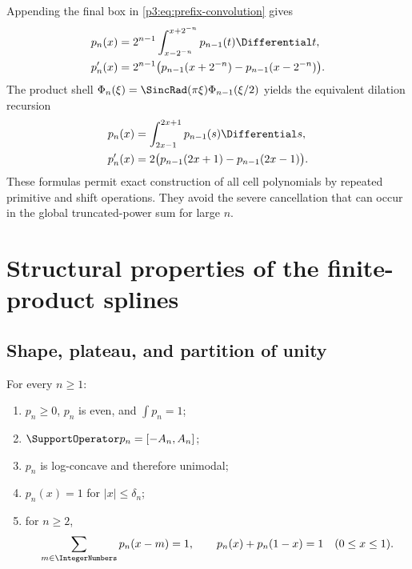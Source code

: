 \documentclass[11pt,oneside]{article}
\numberwithin{equation}{section}
\theoremstyle{definition}
\theoremstyle{remark}
\begin{document}
Appending the final box in \cref{p3:eq:prefix-convolution} gives
\begin{align}
 p_n(x)
 &=2^{n-1}\int_{x-2^{-n}}^{x+2^{-n}}p_{n-1}(t)\Differential t,
 \label{p3:eq:last-box-recursion}\\
 p_n'(x)
 &=2^{n-1}\bigl(p_{n-1}(x+2^{-n})-p_{n-1}(x-2^{-n})\bigr).
 \label{p3:eq:last-box-derivative}
\end{align}
The product shell
$\Phi_n(\xi)=\SincRad(\pi\xi)\Phi_{n-1}(\xi/2)$ yields the equivalent dilation recursion
\begin{align}
 p_n(x)&=\int_{2x-1}^{2x+1}p_{n-1}(s)\Differential s,
 \label{p3:eq:scale-recursion}\\
 p_n'(x)&=2\bigl(p_{n-1}(2x+1)-p_{n-1}(2x-1)\bigr).
 \label{p3:eq:scale-derivative}
\end{align}
These formulas permit exact construction of all cell polynomials by repeated primitive
and shift operations.  They avoid the severe cancellation that can occur in the global
truncated-power sum for large $n$.

\section{Structural properties of the finite-product splines}
\label{p3:sec:properties}

\subsection{Shape, plateau, and partition of unity}

\begin{proposition}
\label{p3:prop:basic-geometry}
For every $n\ge1$:
\begin{enumerate}[label=(\roman*),leftmargin=2.1em]
\item $p_n\ge0$, $p_n$ is even, and $\int p_n=1$;
\item $\SupportOperator p_n=[-A_n,A_n]$;
\item $p_n$ is log-concave and therefore unimodal;
\item $p_n(x)=1$ for $|x|\le\delta_n$;
\item for $n\ge2$,
\begin{equation}
 \sum_{m\in\IntegerNumbers}p_n(x-m)=1,
 \qquad
 p_n(x)+p_n(1-x)=1\quad(0\le x\le1).
 \label{p3:eq:partition-unity}
\end{equation}
\end{enumerate}
\end{proposition}
\end{document}

